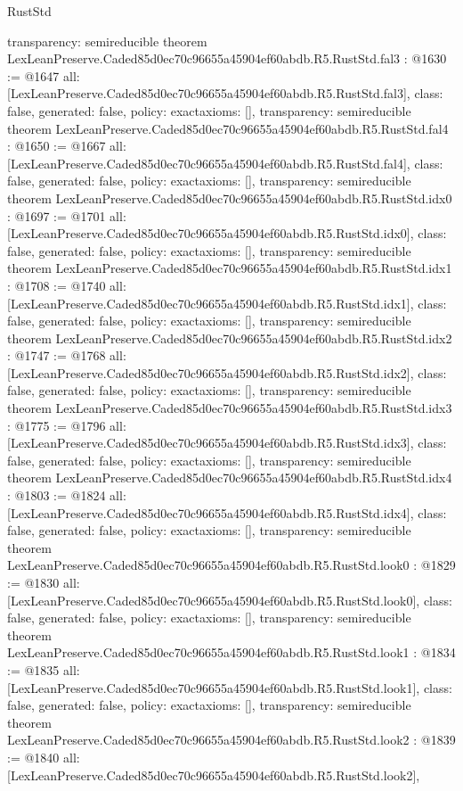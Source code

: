 \begin{lexlean}{RustStd}
\begin{coremodule}
{  transparency: semireducible
}
theorem LexLeanPreserve.Caded85d0ec70c96655a45904ef60abdb.R5.RustStd.fal3 : @1630 := @1647 {
  all: [LexLeanPreserve.Caded85d0ec70c96655a45904ef60abdb.R5.RustStd.fal3],
  class: false,
  generated: false,
  policy: exact{axioms: []},
  transparency: semireducible
}
theorem LexLeanPreserve.Caded85d0ec70c96655a45904ef60abdb.R5.RustStd.fal4 : @1650 := @1667 {
  all: [LexLeanPreserve.Caded85d0ec70c96655a45904ef60abdb.R5.RustStd.fal4],
  class: false,
  generated: false,
  policy: exact{axioms: []},
  transparency: semireducible
}
theorem LexLeanPreserve.Caded85d0ec70c96655a45904ef60abdb.R5.RustStd.idx0 : @1697 := @1701 {
  all: [LexLeanPreserve.Caded85d0ec70c96655a45904ef60abdb.R5.RustStd.idx0],
  class: false,
  generated: false,
  policy: exact{axioms: []},
  transparency: semireducible
}
theorem LexLeanPreserve.Caded85d0ec70c96655a45904ef60abdb.R5.RustStd.idx1 : @1708 := @1740 {
  all: [LexLeanPreserve.Caded85d0ec70c96655a45904ef60abdb.R5.RustStd.idx1],
  class: false,
  generated: false,
  policy: exact{axioms: []},
  transparency: semireducible
}
theorem LexLeanPreserve.Caded85d0ec70c96655a45904ef60abdb.R5.RustStd.idx2 : @1747 := @1768 {
  all: [LexLeanPreserve.Caded85d0ec70c96655a45904ef60abdb.R5.RustStd.idx2],
  class: false,
  generated: false,
  policy: exact{axioms: []},
  transparency: semireducible
}
theorem LexLeanPreserve.Caded85d0ec70c96655a45904ef60abdb.R5.RustStd.idx3 : @1775 := @1796 {
  all: [LexLeanPreserve.Caded85d0ec70c96655a45904ef60abdb.R5.RustStd.idx3],
  class: false,
  generated: false,
  policy: exact{axioms: []},
  transparency: semireducible
}
theorem LexLeanPreserve.Caded85d0ec70c96655a45904ef60abdb.R5.RustStd.idx4 : @1803 := @1824 {
  all: [LexLeanPreserve.Caded85d0ec70c96655a45904ef60abdb.R5.RustStd.idx4],
  class: false,
  generated: false,
  policy: exact{axioms: []},
  transparency: semireducible
}
theorem LexLeanPreserve.Caded85d0ec70c96655a45904ef60abdb.R5.RustStd.look0 : @1829 := @1830 {
  all: [LexLeanPreserve.Caded85d0ec70c96655a45904ef60abdb.R5.RustStd.look0],
  class: false,
  generated: false,
  policy: exact{axioms: []},
  transparency: semireducible
}
theorem LexLeanPreserve.Caded85d0ec70c96655a45904ef60abdb.R5.RustStd.look1 : @1834 := @1835 {
  all: [LexLeanPreserve.Caded85d0ec70c96655a45904ef60abdb.R5.RustStd.look1],
  class: false,
  generated: false,
  policy: exact{axioms: []},
  transparency: semireducible
}
theorem LexLeanPreserve.Caded85d0ec70c96655a45904ef60abdb.R5.RustStd.look2 : @1839 := @1840 {
  all: [LexLeanPreserve.Caded85d0ec70c96655a45904ef60abdb.R5.RustStd.look2],
}
\end{coremodule}
\end{lexlean}
